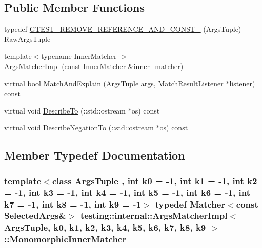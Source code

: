 \subsection*{Public Member Functions}
\begin{DoxyCompactItemize}
\item 
typedef \hyperlink{classtesting_1_1internal_1_1_args_matcher_impl_a7b0cadc369c0c20cd254cc2052782301}{G\+T\+E\+S\+T\+\_\+\+R\+E\+M\+O\+V\+E\+\_\+\+R\+E\+F\+E\+R\+E\+N\+C\+E\+\_\+\+A\+N\+D\+\_\+\+C\+O\+N\+S\+T\+\_\+} (Args\+Tuple) Raw\+Args\+Tuple
\item 
{\footnotesize template$<$typename Inner\+Matcher $>$ }\\\hyperlink{classtesting_1_1internal_1_1_args_matcher_impl_a7f7a9a826d130d11fe30633d79f59a06}{Args\+Matcher\+Impl} (const Inner\+Matcher \&inner\+\_\+matcher)
\item 
virtual bool \hyperlink{classtesting_1_1internal_1_1_args_matcher_impl_a9c9760b144a5e207082fe040c869ad39}{Match\+And\+Explain} (Args\+Tuple args, \hyperlink{classtesting_1_1_match_result_listener}{Match\+Result\+Listener} $\ast$listener) const 
\item 
virtual void \hyperlink{classtesting_1_1internal_1_1_args_matcher_impl_a7e2acf3bee2d8038da0f87673bc82eb2}{Describe\+To} (\+::std\+::ostream $\ast$os) const 
\item 
virtual void \hyperlink{classtesting_1_1internal_1_1_args_matcher_impl_af22ab8bcd4baee6d1c79751d46240289}{Describe\+Negation\+To} (\+::std\+::ostream $\ast$os) const 
\end{DoxyCompactItemize}


\subsection{Member Typedef Documentation}
\subsubsection[{\texorpdfstring{Monomorphic\+Inner\+Matcher}{MonomorphicInnerMatcher}}]{\setlength{\rightskip}{0pt plus 5cm}template$<$class Args\+Tuple , int k0 = -\/1, int k1 = -\/1, int k2 = -\/1, int k3 = -\/1, int k4 = -\/1, int k5 = -\/1, int k6 = -\/1, int k7 = -\/1, int k8 = -\/1, int k9 = -\/1$>$ typedef {\bf Matcher}$<$const {\bf Selected\+Args}\&$>$ {\bf testing\+::internal\+::\+Args\+Matcher\+Impl}$<$ Args\+Tuple, k0, k1, k2, k3, k4, k5, k6, k7, k8, k9 $>$\+::{\bf Monomorphic\+Inner\+Matcher}}\hypertarget{classtesting_1_1internal_1_1_args_matcher_impl_ab90d2c074b2072d6c39bf26209fb941f}{}\label{classtesting_1_1internal_1_1_args_matcher_impl_ab90d2c074b2072d6c39bf26209fb941f}
